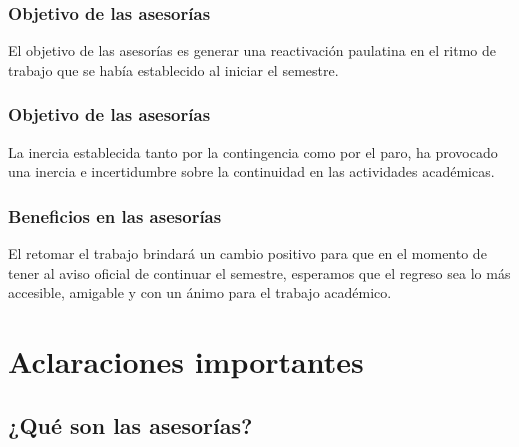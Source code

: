 \begin{frame}
\frametitle{Objetivo de las asesorías}
El objetivo de las asesorías es generar una reactivación paulatina en el ritmo de trabajo que se había establecido al iniciar el semestre.
\end{frame}
\begin{frame}
\frametitle{Objetivo de las asesorías}
La inercia establecida tanto por la contingencia como por el paro, ha provocado una inercia e incertidumbre sobre la continuidad en las actividades académicas.
\end{frame}
\begin{frame}
\frametitle{Beneficios en las asesorías}
El retomar el trabajo brindará un cambio positivo para que en el momento de tener al aviso oficial de continuar el semestre, esperamos que el regreso sea lo más accesible, amigable y con un ánimo para el trabajo académico.
\end{frame}

\section{Aclaraciones importantes}
\subsection{¿Qué son las asesorías?}

